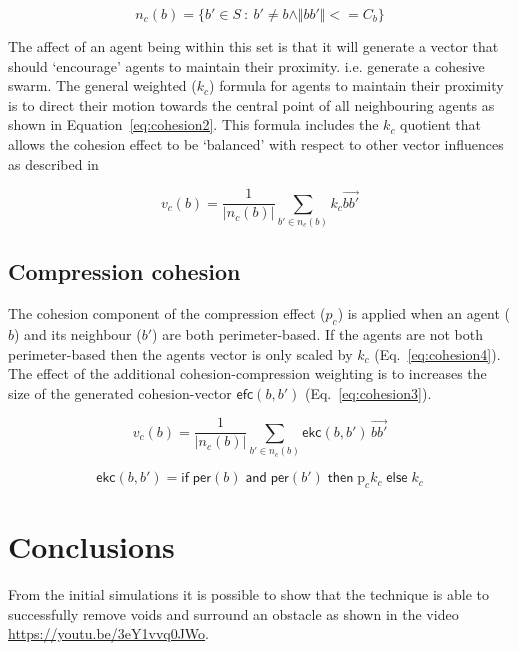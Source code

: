 \documentclass[12pt,a4paper]{article}
\newcommand{\magn}[1]{\Vert{#1}\Vert}
\begin{document}
\begin{equation}\label{eq:cohesion1}
n_c(b) = \{b' \in S~:~b' \neq b \land\magn{bb'} <= C_b\}
\end{equation}

The affect of an agent being within this set is that it will generate a vector that should `encourage' agents to maintain their proximity. i.e. generate a cohesive swarm. The general weighted ($k_c$) formula for agents to maintain their proximity is to direct their motion towards the central point of all neighbouring agents as shown in Equation~\ref{eq:cohesion2}. This formula includes the $k_c$ quotient that allows the cohesion effect to be `balanced' with respect to other vector influences as described in ~\cite{eliot2017methods,eliot2018metric,eliot2019void} 

\begin{equation}\label{eq:cohesion2}
v_c(b) = \frac{1}{\lvert n_c(b)\rvert} \sum_{b' \in n_c(b)}k_c\vec{b b'}
\end{equation}

\subsection{Compression cohesion}
The cohesion component of the compression effect ($p_c$) is applied when an agent ($b$) and its neighbour ($b'$) are both perimeter-based. If the agents are not both perimeter-based then the agents vector is only scaled by $k_c$ (Eq.~\ref{eq:cohesion4}). The effect of the additional cohesion-compression weighting is to increases the size of the generated cohesion-vector $\mathsf{efc}(b,b')$ (Eq.~\ref{eq:cohesion3}). 

\begin{equation}\label{eq:cohesion3}
v_c(b) = \frac{1}{\lvert n_c(b)\rvert} \sum_{b' \in n_c(b)}\mathsf{ekc}(b, b')\, \vec{b b'}
\end{equation}

\begin{equation}\label{eq:cohesion4}
\mathsf{ekc}(b, b') = \mathsf{if} \; \mathsf{per}(b) \; \mathsf{and} \; \mathsf{per}(b') \; \mathsf{then} \; \mathrm{p}_ck_c \; \mathsf{else} \; k_c
\end{equation}

\section{Conclusions}\label{conclusions}
From the initial simulations it is possible to show that the technique is able to successfully remove voids and surround an obstacle as shown in the video \href{https://youtu.be/3eY1vvq0JWo}{https://youtu.be/3eY1vvq0JWo}.



\end{document}
